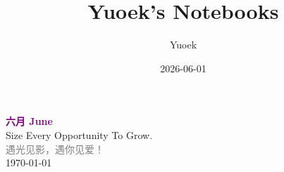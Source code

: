 \documentclass[UTF8, a4paper, 12pt]{ctexart}
\title{\Large Yuoek's Notebooks}
\author{Yuoek}
\date{2026-06-01}
\begin{document}
\thispagestyle{empty}
\maketitle
\clearpage

\thispagestyle{empty}
\vspace*{\fill}
\begin{center}
    \textcolor{purple}{\Huge\textbf{六月 June}} \\[1em]
    \textcolor{purple!60!black}{\Large Size Every Opportunity To Grow.} \\[2em]
    \textcolor{gray}{\large 遇光见影，遇你见爱！} \\[1em]
    \today
\end{center}

\vspace*{\fill}
\clearpage
\tableofcontents


\clearpage
\thispagestyle{empty}


\clearpage
\thispagestyle{empty}




\clearpage
\thispagestyle{empty}

\clearpage
\thispagestyle{empty}

\clearpage
\thispagestyle{empty}

\clearpage
\thispagestyle{empty}
\end{document}
